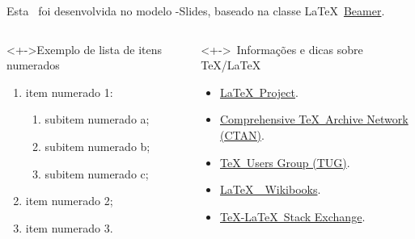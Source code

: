 \documentclass[%
  aspectratio = 169,%
  10pt,%
  t,%
  onlytextwidth,%
  compress,%
  handout,%
  xcolor = table,%
  english,%
  brazilian,%
]{beamer}
\begin{document}
\begin{frame}

Esta \DocType\ foi desenvolvida no modelo \UTFPR-Slides, baseado na classe \LaTeX\ \href{https://www.ctan.org/pkg/beamer/}{Beamer\LinkIcon}.

\pause%

\begin{columns}[b]


\begin{block}<+->{Exemplo de lista de itens numerados}

\begin{enumerate}[<+-|alert@+>]
\item item numerado 1:
\begin{enumerate}
\item subitem numerado a;
\item subitem numerado b;
\item subitem numerado c;
\end{enumerate}
\item item numerado 2;
\item item numerado 3.
\end{enumerate}

\end{block}


\begin{alertblock}<+->{\faInfoCircle\ Informações e dicas sobre \TeX/\LaTeX}

\begin{itemize}
\item \href{https://www.latex-project.org/}{\LaTeX\ Project\LinkIcon}.
\item \href{https://www.ctan.org/}{Comprehensive \TeX\ Archive Network (CTAN)\LinkIcon}.
\item \href{https://www.tug.org/}{\TeX\ Users Group (TUG)\LinkIcon}.
\item \href{https://en.wikibooks.org/wiki/LaTeX/}{\LaTeX\ \textemdash\ Wikibooks\LinkIcon}.
\item \href{https://tex.stackexchange.com/}{\TeX-\LaTeX\ Stack Exchange\LinkIcon}.
\end{itemize}

\end{alertblock}

\end{columns}

\end{frame}
\end{document}
